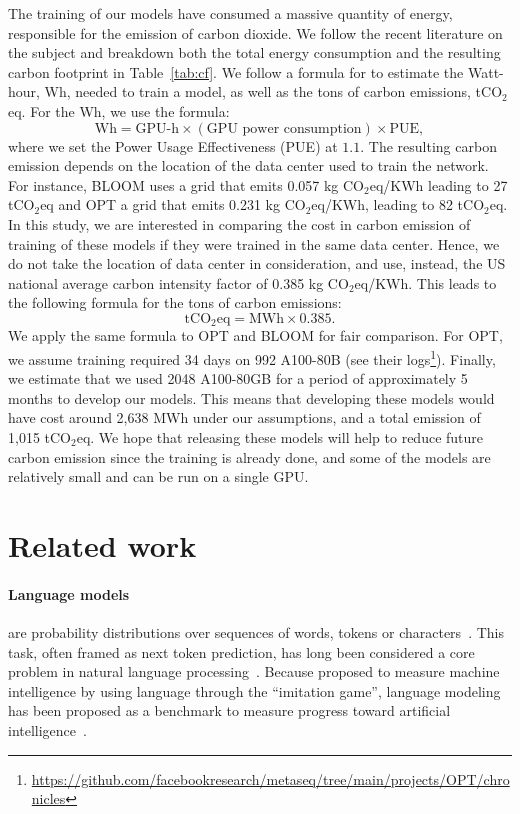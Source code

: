 The training of our models have consumed a massive quantity of energy, responsible for the emission of carbon dioxide. We follow the recent literature on the subject and breakdown both the total energy consumption and the resulting carbon footprint in Table~\ref{tab:cf}.
We follow a formula for \citet{wu2022sustainable} to estimate the Watt-hour, Wh,  needed to train a model, as well as the tons of carbon emissions, tCO$_2$eq. For the Wh, we use the formula:
$$\textrm{Wh} = \textrm{GPU-h}\times(\textrm{GPU power consumption}) \times \textrm{PUE},$$ where we set the Power Usage Effectiveness (PUE) at $1.1$. The resulting carbon emission depends on the location of the data center used to train the network. For instance, BLOOM uses a grid that emits 0.057 kg CO$_2$eq/KWh leading to 27 tCO$_2$eq and OPT a grid that emits 0.231 kg CO$_2$eq/KWh, leading to 82 tCO$_2$eq. In this study, we are interested in comparing the cost in carbon emission of training of these models if they were trained in the same data center. Hence, we do not take the location of data center in consideration, and use, instead, the US national average carbon intensity factor of 0.385 kg CO$_2$eq/KWh. This leads to the following formula for the tons of carbon emissions:
$$\textrm{tCO}_2\textrm{eq}=\textrm{MWh}\times0.385.$$
We apply the same formula to OPT and BLOOM for fair comparison. For OPT, we assume training required 34 days on 992 A100-80B (see their logs\footnote{\url{https://github.com/facebookresearch/metaseq/tree/main/projects/OPT/chronicles}}).
Finally, we estimate that we used 2048 A100-80GB for a period of approximately 5 months to develop our models. This means that developing these models would have cost around 2,638 MWh under our assumptions, and a total emission of 1,015 tCO$_2$eq. We hope that releasing these models will help to reduce future carbon emission since the training is already done, and some of the models are relatively small and can be run on a single GPU.

\section{Related work}
\paragraph{Language models} are probability distributions over sequences of words, tokens or characters~\citep{shannon1948mathematical,shannon1951prediction}. This task, often framed as next token prediction, has long been considered a core problem in natural language processing~\citep{bahl1983maximum,brown1990statistical}. Because \citet{turing1950computing} proposed to measure machine intelligence by using language through the ``imitation game'', language modeling has been proposed as a benchmark to measure progress toward artificial intelligence~\citep{mahoney1999text}.

